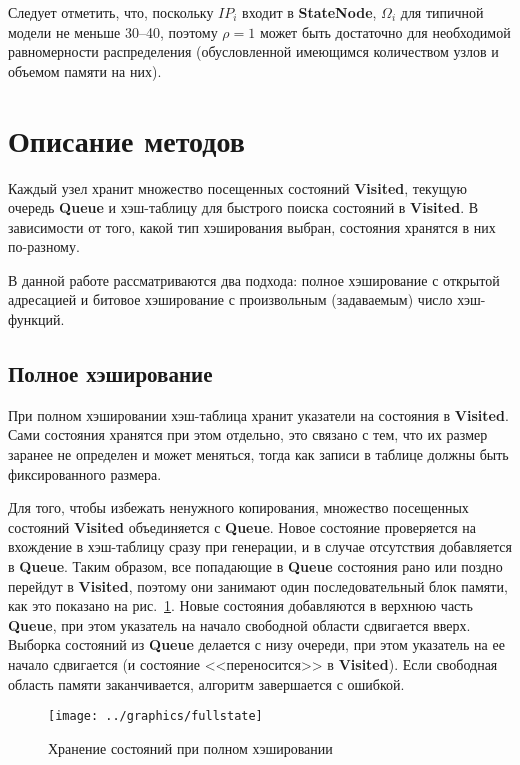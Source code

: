 \documentclass[12pt,a4paper,fleqn]{article}
\newcommand{\Code}[1]{\textbf{\mbox{#1}}}
\begin{document}
Следует отметить, что, поскольку $IP_i$ входит в \Code{StateNode}, $\Omega_i$ для типичной
модели не меньше 30--40, поэтому $\rho = 1$ может быть достаточно для необходимой
равномерности распределения (обусловленной имеющимся количеством узлов и объемом памяти на
них).

\section{Описание методов}

Каждый узел хранит множество посещенных состояний \Code{Visited}, текущую очередь \Code{Queue} и
хэш-таблицу для быстрого поиска состояний в \Code{Visited}. В зависимости от того, какой тип
хэширования выбран, состояния хранятся в них по-разному.

В данной работе рассматриваются два подхода: полное хэширование с открытой адресацией и
битовое хэширование с произвольным (задаваемым) число хэш-функций.

\subsection{Полное хэширование}

При полном хэшировании хэш-таблица хранит указатели на состояния в \Code{Visited}. Сами
состояния хранятся при этом отдельно, это связано с тем, что их размер заранее не
определен и может меняться, тогда как записи в таблице должны быть фиксированного размера.

Для того, чтобы избежать ненужного копирования, множество посещенных состояний \Code{Visited}
объединяется с \Code{Queue}. Новое состояние проверяется на вхождение в хэш-таблицу сразу при
генерации, и в случае отсутствия добавляется в \Code{Queue}. Таким образом, все попадающие в
\Code{Queue} состояния рано или поздно перейдут в \Code{Visited}, поэтому они занимают один
последовательный блок памяти, как это показано на рис.~\ref{fig:fullstate}. Новые состояния
добавляются в верхнюю часть \Code{Queue}, при этом указатель на начало свободной области сдвигается
вверх. Выборка состояний из \Code{Queue} делается с низу очереди, при этом указатель на ее начало
сдвигается (и состояние <<переносится>> в \Code{Visited}). Если свободная область памяти
заканчивается, алгоритм завершается с ошибкой.

\begin{figure}[ht]
  \centering
  \texttt{[image: ../graphics/fullstate]}
  \caption{Хранение состояний при полном хэшировании}
  \label{fig:fullstate}
\end{figure}
\end{document}
